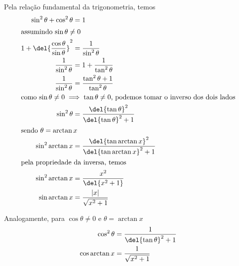 \documentclass[]{IMTexam}
\begin{document}
\begin{questions}
\begin{solution}
		Pela relação fundamental da trigonometria, temos
		\begin{align}
			\sin^{2}\theta+\cos^{2}\theta              & =1\nonumber                                                          \\
			\intertext{assumindo $ \sin\theta\neq0 $}
			1+\del{\dfrac{\cos\theta}{\sin\theta}}^{2} & =\dfrac{1}{\sin^{2}\theta}\nonumber                                  \\
			\dfrac{1}{\sin^{2}\theta}                  & =1+\dfrac{1}{\tan^{2}\theta}                                         \\
			\dfrac{1}{\sin^{2}\theta}                  & =\dfrac{\tan^{2}\theta+1}{\tan^{2}\theta}\nonumber                   \\
			\intertext{como $ \sin\theta\neq0\implies\tan\theta\neq0 $, podemos tomar o inverso dos dois lados}
			\sin^{2}\theta                             & =\dfrac{\del{\tan\theta}^{2}}{\del{\tan\theta}^{2}+1}\nonumber       \\
			\intertext{sendo $ \theta=\arctan x $}
			\sin^{2}\arctan x                          & =\dfrac{\del{\tan\arctan x}^{2}}{\del{\tan\arctan x}^{2}+1}\nonumber \\
			\intertext{pela propriedade da inversa, temos}
			\sin^{2}\arctan x                          & =\dfrac{x^{2}}{\del{x^{2}+1}}\nonumber                               \\
			\sin\arctan x                              & =\dfrac{|x|}{\sqrt{x^{2}+1}}\label{eq:senArctan}
		\end{align}

		Analogamente, para $ \cos\theta\neq0 $ e $ \theta=\arctan x $
		\begin{align}
			\cos^{2}\theta & =\dfrac{1}{\del{\tan\theta}^{2}+1}\nonumber    \\
			\cos\arctan x  & =\dfrac{1}{\sqrt{x^{2}+1}}\label{eq:cosArctan}
		\end{align}


\end{solution}
\end{questions}
\end{document}
